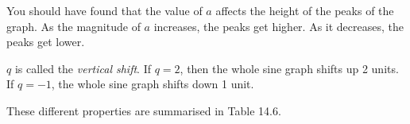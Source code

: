         
        

        \label{m39414*id85165}You should have found that the value of \begin{math}a\end{math} affects the height of the peaks of the graph. As the magnitude of \begin{math}a\end{math} increases, the peaks get higher. As it decreases, the peaks get lower.\par 
        \label{m39414*id85188}\begin{math}q\end{math} is called the \textsl{vertical shift}. If \begin{math}q=2\end{math}, then the whole sine graph shifts up 2 units. If \begin{math}q=-1\end{math}, the whole sine graph shifts down 1 unit.\par 
        \label{m39414*id85237}These different properties are summarised in Table 14.6.\par 

        
    
      
    
    \setlength\mytablespace{6\tabcolsep}
    \addtolength\mytablespace{4\arrayrulewidth}
    \setlength\mytablewidth{\linewidth}
        
    
    \setlength\mytableroom{\mytablewidth}
    \addtolength\mytableroom{-\mytablespace}
    
    \setlength\myfixedwidth{0pt}
    \setlength\mystarwidth{\mytableroom}
        \addtolength\mystarwidth{-\myfixedwidth}
        \divide{}
        
